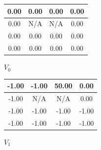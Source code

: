 \documentclass{article}
\begin{document}
\begin{figure}[H]
    \centering
    \begin{minipage}{0.3\textwidth}
        \centering
        \begin{tabular}{|c|c|c|c|}
        \hline
        0.00 & 0.00 & 0.00 & 0.00 \\
        \hline
        0.00 & N/A & N/A & 0.00 \\
        \hline
        0.00 & 0.00 & 0.00 & 0.00 \\
        \hline
        0.00 & 0.00 & 0.00 & 0.00 \\
        \hline
        \end{tabular}
        \vspace{0.5em}
        \small $V_0$
    \end{minipage}
    \hfill
    \begin{minipage}{0.3\textwidth}
        \centering
        \begin{tabular}{|c|c|c|c|}
        \hline
        -1.00 & -1.00 & 50.00 & 0.00 \\
        \hline
        -1.00 & N/A & N/A & 0.00 \\
        \hline
        -1.00 & -1.00 & -1.00 & -1.00 \\
        \hline
        -1.00 & -1.00 & -1.00 & -1.00 \\
        \hline
        \end{tabular}
        \vspace{0.5em}
        \small $V_1$
    \end{minipage}
    \end{figure}
\end{document}
